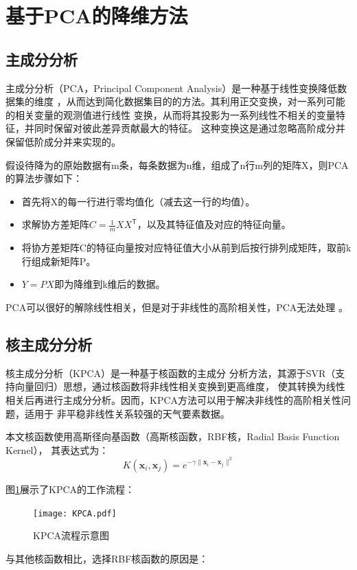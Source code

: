 \documentclass[AutoFakeBold]{LZUThesis}
\begin{document}
\section{基于PCA的降维方法}
\subsection{主成分分析}
主成分分析（PCA，Principal Component Analysis）是一种基于线性变换降低数据集的维度
，从而达到简化数据集目的的方法。其利用正交变换，对一系列可能的相关变量的观测值进行线性
变换，从而将其投影为一系列线性不相关的变量特征，并同时保留对彼此差异贡献最大的特征。
这种变换这是通过忽略高阶成分并保留低阶成分并来实现的。

假设待降为的原始数据有m条，每条数据为n维，组成了n行m列的矩阵X，则PCA的算法步骤如下：

\begin{itemize}
    \item 首先将X的每一行进行零均值化（减去这一行的均值）。
    \item 求解协方差矩阵$C=\frac{1}{m}XX^\mathsf{T}$，以及其特征值及对应的特征向量。
    \item 将协方差矩阵C的特征向量按对应特征值大小从前到后按行排列成矩阵，取前k行组成新矩阵P。
    \item $Y=PX$即为降维到k维后的数据。
\end{itemize}
PCA可以很好的解除线性相关，但是对于非线性的高阶相关性，PCA无法处理
。

\subsection{核主成分分析}
核主成分分析（KPCA）是一种基于核函数的主成分
分析方法，其源于SVR（支持向量回归）思想，通过核函数将非线性相关变换到更高维度，
使其转换为线性相关后再进行主成分分析。因而，KPCA方法可以用于解决非线性的高阶相关性问题，适用于
非平稳非线性关系较强的天气要素数据。

本文核函数使用高斯径向基函数（高斯核函数，RBF核，Radial Basis Function Kernel），
其表达式为：
$$K(\mathbf x_i,\mathbf x_j)=e^{-\gamma\|\mathbf x_i-\mathbf x_j\|^2}$$

图\ref{fig_kpca}展示了KPCA的工作流程：
\begin{figure}[H]
    \centering
    \texttt{[image: KPCA.pdf]}
    \caption{KPCA流程示意图}
    \label{fig_kpca}
  \end{figure}

与其他核函数相比，选择RBF核函数的原因是：
\end{document}
